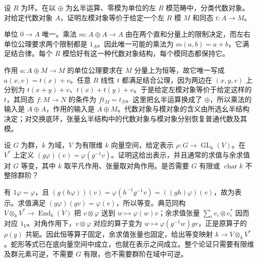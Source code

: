 \begin{exercise}\label{b4:ex:direct-sum-algebra-objects}
	设 \(R\) 为环。在以 \(\oplus\) 为幺半运算、零模为单位的左 \(R\) 模范畴中，分类代数对象。对给定代数对象 \(A\)，证明左模对象等价于给定一个左 \(R\) 模 \(M\) 和同态 \(t:A\to M\)。
\end{exercise}
\begin{solution}
	单位 \(0\to A\) 唯一。乘法 \(m:A\oplus A\to A\) 由在两个直和分量上的限制决定，而左右单位公理要求两个限制都是 \(1_A\)。因此唯一可能的乘法为 \(m(a,b)=a+b\)，它满足结合律。每个 \(R\) 模恰好有这一种代数对象结构，每个模同态都保持它。

	作用 \(a:A\oplus M\to M\) 的单位公理要求在 \(M\) 分量上为恒等，故它唯一写成 \(a(x,v)=t(x)+v\)。任意 \(R\) 线性 \(t\) 都满足结合公理，因为两边在 \((x,y,v)\) 上分别为 \(t(x+y)+v\)、\(t(x)+t(y)+v\)。于是给定左模对象等价于给定这样的 \(t\)，其同态 \(f:M\to N\) 的条件为 \(f t_M=t_N\)。这里把幺半运算换成了 \(\oplus\)，所以乘法的输入是 \(A\oplus A\)，作用的输入是 \(A\oplus M\)。代数对象与模对象的含义由所选幺半结构决定；对交换底环，张量幺半结构中的代数对象与模对象分别恢复普通代数及其模。
\end{solution}

\begin{exercise}\label{b4:ex:representation-duals}
	设 \(G\) 为群，\(k\) 为域，\(V\) 为有限维 \(k\) 向量空间，给定表示 \(\rho:G\to\operatorname{GL}_k(V)\)。在 \(V^*\) 上定义 \((g\varphi)(v)=\varphi(g^{-1}v)\)。证明这给出表示，并且通常的求值与余求值对 \(G\) 等变，其中 \(k\) 取平凡作用、张量取对角作用。是否需要 \(G\) 有限或 \(\operatorname{char}k\) 不整除群阶？
\end{exercise}
\begin{solution}
	有 \(1\varphi=\varphi\)，且 \((g(h\varphi))(v)=\varphi(h^{-1}g^{-1}v)=((gh)\varphi)(v)\)，故为表示。求值满足 \((g\varphi)(gv)=\varphi(v)\)，所以等变。典范同构 \(V\otimes_kV^*\to\operatorname{End}_k(V)\) 把 \(v\otimes\varphi\) 送到 \(w\mapsto\varphi(w)v\)；余求值张量 \(\sum_i e_i\otimes e_i^*\) 因而对应 \(1_V\)。对角作用下，\(v\otimes\varphi\) 对应的算子变为 \(w\mapsto\varphi(g^{-1}w)gv\)，正是原算子的 \(\rho(g)\) 共轭。因此恒等算子固定，余求值张量也固定，给出等变映射 \(k\to V\otimes_kV^*\)。蛇形等式已在底向量空间中成立，也就在表示之间成立。整个论证只需要有限维及群元素可逆，不需要 \(G\) 有限，也不需要群阶在域中可逆。
\end{solution}
